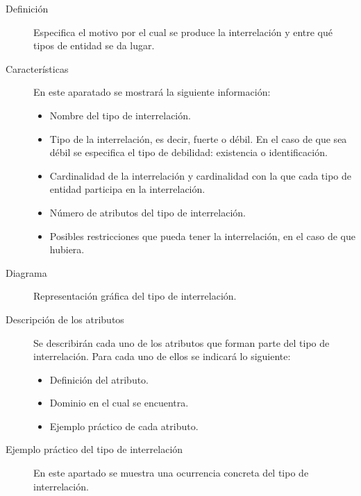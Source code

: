    \begin{description}
      \item[Definición] Especifica el motivo por el cual se produce la
           interrelación y entre qué tipos de entidad se da lugar.

      \item[Características] En este aparatado se mostrará la siguiente
           información:

            \begin{itemize}
             \item Nombre del tipo de interrelación.
             \item Tipo de la interrelación, es decir, fuerte o débil. En el
                   caso de que sea débil se especifica el tipo de debilidad:
                   existencia o identificación.
             \item Cardinalidad de la interrelación y cardinalidad con la que
                   cada tipo de entidad participa en la interrelación.
             \item Número de atributos del tipo de interrelación.
             \item Posibles restricciones que pueda tener la interrelación, en
                   el caso de que hubiera.
            \end{itemize}

      \item[Diagrama] Representación gráfica del tipo de interrelación.

      \item[Descripción de los atributos] Se describirán cada uno de los
           atributos que forman parte del tipo de interrelación. Para cada uno
           de ellos se indicará lo siguiente:

           \begin{itemize}
            \item Definición del atributo.
            \item Dominio en el cual se encuentra.
            \item Ejemplo práctico de cada atributo.
           \end{itemize}

      \item[Ejemplo práctico del tipo de interrelación] En este apartado se
           muestra una ocurrencia concreta del tipo de interrelación.
   \end{description}

